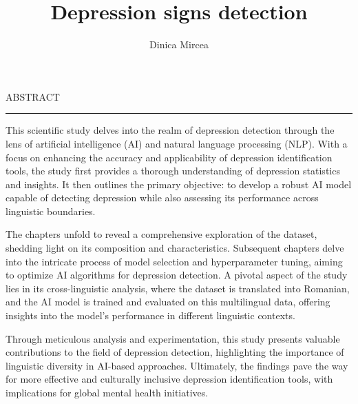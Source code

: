 \documentclass[12pt]{report}
\begin{document}
\title{Depression signs detection}					   
\author{Dinica Mircea}											
				
\maketitle


\newpage
\thispagestyle{empty}
\mbox{}
\newpage
{} 

\cleardoublepage
ABSTRACT
\vspace{0.5cm}	
\hrule
\vspace{0.5cm}	

This scientific study delves into the realm of depression detection through the lens of artificial intelligence (AI) and natural language processing (NLP). With a focus on enhancing the accuracy and applicability of depression identification tools, the study first provides a thorough understanding of depression statistics and insights. It then outlines the primary objective: to develop a robust AI model capable of detecting depression while also assessing its performance across linguistic boundaries.

The chapters unfold to reveal a comprehensive exploration of the dataset, shedding light on its composition and characteristics. Subsequent chapters delve into the intricate process of model selection and hyperparameter tuning, aiming to optimize AI algorithms for depression detection. A pivotal aspect of the study lies in its cross-linguistic analysis, where the dataset is translated into Romanian, and the AI model is trained and evaluated on this multilingual data, offering insights into the model's performance in different linguistic contexts.

Through meticulous analysis and experimentation, this study presents valuable contributions to the field of depression detection, highlighting the importance of linguistic diversity in AI-based approaches. Ultimately, the findings pave the way for more effective and culturally inclusive depression identification tools, with implications for global mental health initiatives.



\tableofcontents


\newpage
{}










\end{document}
